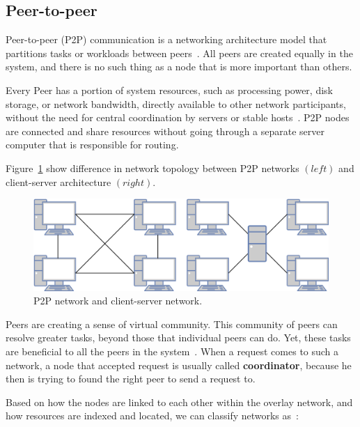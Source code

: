 \subsection{Peer-to-peer}\label{sec:p2p_networks}
%
Peer-to-peer (P2P) communication is a networking architecture model that partitions tasks or workloads between peers~\cite{Schollmeier01}. All peers are created equally in the system, and there is no such thing as a node that is more important than others. 

Every Peer has a portion of system resources, such as processing power, disk storage, or network bandwidth, directly available to other network participants, without the need for central coordination by servers or stable hosts~\cite{Schollmeier01}. P2P nodes are connected and share resources without going through a separate server computer that is responsible for routing. 

Figure~\ref{fig:fig2} show difference in network topology between P2P networks $(left)$ and client-server architecture $(right)$.

\begin{figure}[H]
	\begin{center}
		\includegraphics[scale=0.7]{images/Figure2.png}
	\end{center}
	\vspace{-0.6cm}
	\caption{P2P network and client-server network.}
	\label{fig:fig2}
\end{figure}

\noindent
Peers are creating a sense of virtual community. This community of peers can resolve greater tasks, beyond those that individual peers can do. Yet, these tasks are beneficial to all the peers in the system~\cite{BandaraJ13}. When a request comes to such a network, a node that accepted request is usually called \textbf{coordinator}, because he then is trying to found the right peer to send a request to.

Based on how the nodes are linked to each other within the overlay network, and how resources are indexed and located, we can classify networks as~\cite{KamelSE07}:

